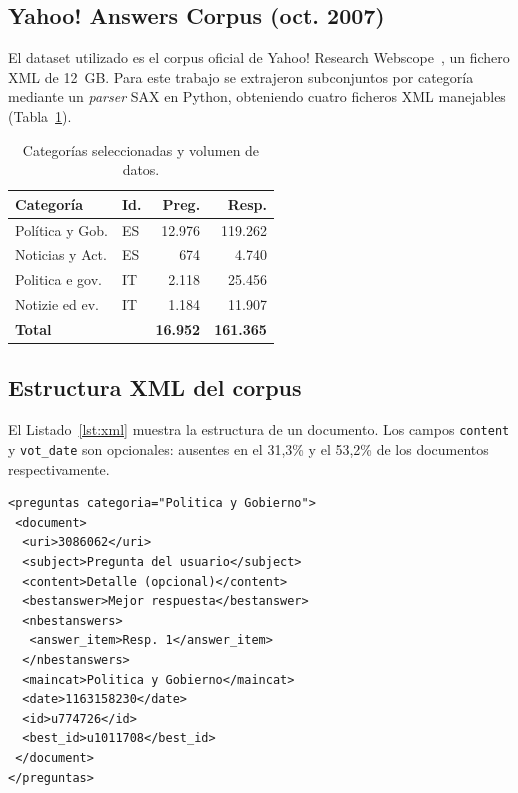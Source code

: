 \documentclass[10pt,twocolumn,a4paper]{article}
\begin{document}
\subsection{Yahoo! Answers Corpus (oct. 2007)}

El dataset utilizado es el corpus oficial de Yahoo! Research
Webscope~\cite{yahoowebscope}, un fichero XML de 12~GB. Para este trabajo
se extrajeron subconjuntos por categor\'ia mediante un \textit{parser} SAX
en Python, obteniendo cuatro ficheros XML manejables (Tabla~\ref{tab:categorias}).

\begin{table}[H]
\centering
\caption{Categor\'ias seleccionadas y volumen de datos.}
\label{tab:categorias}
\begin{tabular}{p{2.2cm}lrr}
\toprule
\textbf{Categor\'ia} & \textbf{Id.} & \textbf{Preg.} & \textbf{Resp.} \\
\midrule
Pol\'itica y Gob. & ES & 12.976 & 119.262 \\
Noticias y Act.   & ES &    674 &   4.740 \\
Politica e gov.   & IT &  2.118 &  25.456 \\
Notizie ed ev.    & IT &  1.184 &  11.907 \\
\midrule
\textbf{Total} & & \textbf{16.952} & \textbf{161.365} \\
\bottomrule
\end{tabular}
\end{table}

\subsection{Estructura XML del corpus}

El Listado~\ref{lst:xml} muestra la estructura de un documento.
Los campos \texttt{content} y \texttt{vot\_date} son opcionales:
ausentes en el 31,3\% y el 53,2\% de los documentos respectivamente.

\vspace{1cm}
\begin{lstlisting}[language=XMLL,caption={Estructura de un documento del corpus.},label=lst:xml, xleftmargin=0.5cm]
<preguntas categoria="Politica y Gobierno">
 <document>
  <uri>3086062</uri>
  <subject>Pregunta del usuario</subject>
  <content>Detalle (opcional)</content>
  <bestanswer>Mejor respuesta</bestanswer>
  <nbestanswers>
   <answer_item>Resp. 1</answer_item>
  </nbestanswers>
  <maincat>Politica y Gobierno</maincat>
  <date>1163158230</date>
  <id>u774726</id>
  <best_id>u1011708</best_id>
 </document>
</preguntas>
\end{lstlisting}
\end{document}
